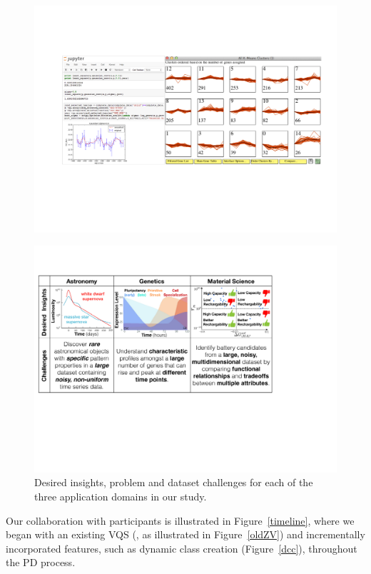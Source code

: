 \begin{figure}[h!]
\captionsetup{font=normalsize,labelfont=normalsize}
 \centering
 \includegraphics[width=0.6\linewidth]{figures/CIscreenshot.pdf}
 \caption{}
 \label{CIscreenshot}
\end{figure}
\begin{figure}[h!]
  \captionsetup{font=normalsize,labelfont=normalsize}
    \centering
    \includegraphics[width=0.5\linewidth]{figures/science_goal.pdf}
    \caption{Desired insights, problem and dataset challenges for each of the three application domains in our study.}
    \label{science_goal}
   \end{figure}
 \npar Our collaboration with participants is illustrated in Figure~\ref{timeline}, where we began with an existing VQS (\zv, as illustrated in Figure~\ref{oldZV}) and incrementally incorporated features, such as dynamic class creation (Figure~\ref{dcc}), throughout the PD process. 
